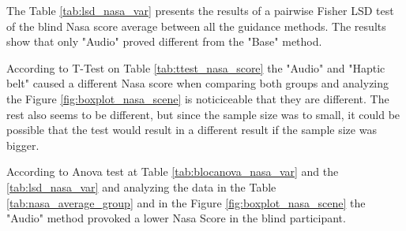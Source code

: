 

The Table \ref{tab:lsd_nasa_var} presents the results of a pairwise Fisher LSD test of the blind Nasa score average between all the guidance methods. The results show that only "Audio" proved different from the "Base" method.



According to T-Test on Table \ref{tab:ttest_nasa_score} the "Audio" and "Haptic belt" caused a different Nasa score when comparing both groups and analyzing the Figure \ref{fig:boxplot_nasa_scene} is noticiceable that they are different. The rest also seems to be different, but since the sample size was to small, it could be possible that the test would result in a different result if the sample size was bigger.

According to Anova test at Table \ref{tab:blocanova_nasa_var} and the \ref{tab:lsd_nasa_var} and analyzing the data in the Table \ref{tab:nasa_average_group} and in the Figure \ref{fig:boxplot_nasa_scene} the "Audio" method provoked a lower Nasa Score in the blind participant.









\FloatBarrier